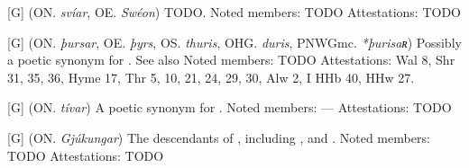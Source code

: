 \begin{itemize}
[G] (ON. \emph{svíar}, OE. \emph{Swéon})
  TODO.
  Noted members: TODO
  Attestations: TODO

[G] (ON. \emph{þursar}, OE. \emph{þyrs}, OS. \emph{thuris}, OHG. \emph{duris}, PNWGmc. \emph{*þurisaʀ})
  Possibly a poetic synonym for . See also 
  Noted members: TODO
  Attestations: Wal 8, Shr 31, 35, 36, Hyme 17, Thr 5, 10, 21, 24, 29, 30, Alw 2, I HHb 40, HHw 27.

[G] (ON. \emph{tívar})
  A poetic synonym for .
  Noted members: —
  Attestations: TODO

[G] (ON. \emph{Gjúkungar})
  The descendants of , including ,  and .
  Noted members: TODO
  Attestations: TODO

\end{itemize}

